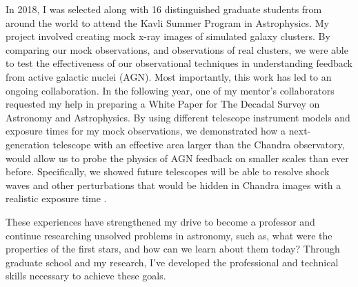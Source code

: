\documentclass[letterpaper, 12pt]{article}
\begin{document}
In 2018, I was selected along with 16 distinguished graduate students from around the world to attend the Kavli Summer Program in Astrophysics. My project involved creating mock x-ray images of simulated galaxy clusters. By comparing our mock observations, and observations of real clusters, we were able to test the effectiveness of our observational techniques in understanding feedback from active galactic nuclei (AGN). Most importantly, this work has led to an ongoing collaboration. In the following year, one of my mentor's collaborators requested my help in preparing a White Paper for The Decadal Survey on Astronomy and Astrophysics. By using different telescope instrument models and exposure times for my mock observations, we demonstrated how a next-generation telescope with an effective area larger than the Chandra observatory, would allow us to probe the physics of AGN feedback on smaller scales than ever before. Specifically, we showed future telescopes will be able to resolve shock waves and other perturbations that would be hidden in Chandra images with a realistic exposure time \citep{WP_Ruszkowski2019}. 

These experiences have strengthened my drive to become a professor and continue researching unsolved problems in astronomy, such as, what were the properties of the first stars, and how can we learn about them today? Through graduate school and my research, I've developed the professional and technical skills necessary to achieve these goals.



  
\end{document}
